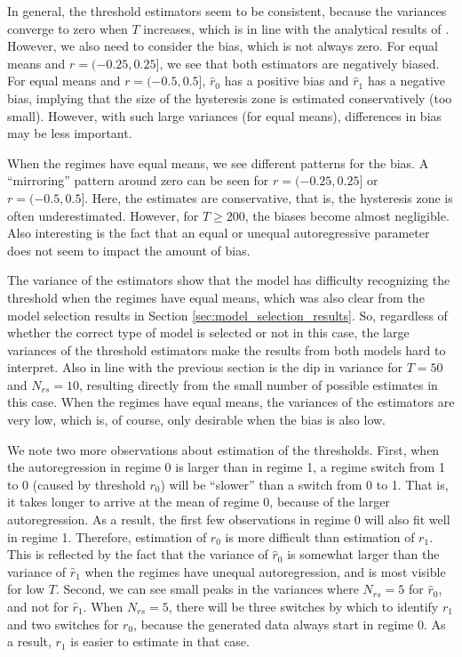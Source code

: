 \documentclass{article}
\begin{document}
In general, the threshold estimators seem to be consistent, because the variances converge to zero when $T$ increases, which is in line with the analytical results of \cite{bar2}.
However, we also need to consider the bias, which is not always zero. 
For equal means and $r = (-0.25, 0.25]$, we see that both estimators are negatively biased. 
For equal means and $r = (-0.5, 0.5]$, $\hat{r}_0$ has a positive bias and $\hat{r}_1$ has a negative bias, implying that the size of the hysteresis zone is estimated conservatively (too small).
However, with such large variances (for equal means), differences in bias may be less important.

When the regimes have equal means, we see different patterns for the bias.
A ``mirroring'' pattern around zero can be seen for $r = (-0.25, 0.25]$ or $r = (-0.5, 0.5]$. Here, the estimates are conservative, that is, the hysteresis zone is often underestimated.
However, for $T\ge 200$, the biases become almost negligible.
Also interesting is the fact that an equal or unequal autoregressive parameter does not seem to impact the amount of bias.

The variance of the estimators show that the model has difficulty recognizing the threshold when the regimes have equal means, which was also clear from the model selection results in Section \ref{sec:model_selection_results}.
So, regardless of whether the correct type of model is selected or not in this case, the large variances of the threshold estimators make the results from both models hard to interpret.
Also in line with the previous section is the dip in variance for $T = 50$ and $N_{rs}= 10$, resulting directly from the small number of possible estimates in this case.
When the regimes have equal means, the variances of the estimators are very low, which is, of course, only desirable when the bias is also low.

We note two more observations about estimation of the thresholds. 
First, when the autoregression in regime 0 is larger than in regime 1, a regime switch from 1 to 0 (caused by threshold $r_0$) will be ``slower'' than a switch from 0 to 1. That is, it takes longer to arrive at the mean of regime 0, because of the larger autoregression. 
As a result, the first few observations in regime 0 will also fit well in regime 1. Therefore, estimation of $r_0$ is more difficult than estimation of $r_1$. 
This is reflected by the fact that the variance of $\hat{r}_0$ is somewhat larger than the variance of $\hat{r}_1$ when the regimes have unequal autoregression, and is most visible for low $T$.
Second, we can see small peaks in the variances where $N_{rs} = 5$ for $\hat{r}_0$, and not for $\hat{r}_1$. 
When $N_{rs} = 5$, there will be three switches by which to identify $r_1$ and two switches for $r_0$, because the generated data always start in regime 0. As a result, $r_1$ is easier to estimate in that case.
\end{document}
